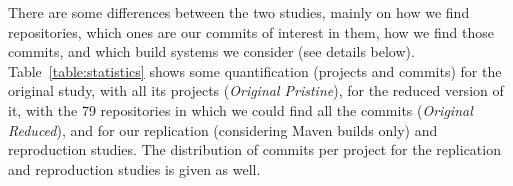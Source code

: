 \renewcommand{\tabcolsep}{6pt}

There are some differences between the two studies, mainly on how we find repositories, which ones are our commits of interest in them, how we find those commits, and which build systems we consider (see details below). Table~\ref{table:statistics} shows some quantification (projects and commits) for the original study, with all its projects (\textit{Original Pristine}), for the reduced version of it, with the 79 repositories in which we could find all the commits (\textit{Original Reduced}), and for our replication (considering Maven builds only) and reproduction studies. The distribution of commits per project for the replication and reproduction studies is given as well.








